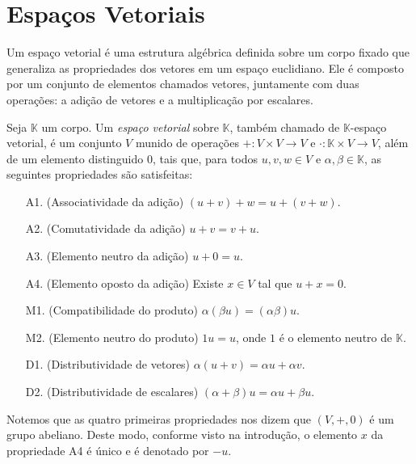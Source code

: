 \section{Espaços Vetoriais}

Um espaço vetorial é uma estrutura algébrica definida sobre um corpo fixado que generaliza as propriedades dos vetores em um espaço euclidiano. Ele é composto por um conjunto de elementos chamados vetores, juntamente com duas operações: a adição de vetores e a multiplicação por escalares.

\begin{definition}
    Seja $\mathbb K$ um corpo.
    Um \emph{espaço vetorial} sobre $\mathbb K$, também chamado de $\mathbb K$-espaço vetorial, é um conjunto $V$ munido de operações $+: V \times V \to V$ e $\cdot: \mathbb K \times V \to V$, além de um elemento distinguido $0$, tais que, para todos $u, v, w \in V$ e $\alpha, \beta \in \mathbb K$, as seguintes propriedades são satisfeitas:
    \begin{itemize}
        \item[A1.] (Associatividade da adição) $(u + v) + w = u + (v + w)$.
        \item[A2.] (Comutatividade da adição) $u + v = v + u$.
        \item[A3.] (Elemento neutro da adição) $u + 0 = u$.
        \item[A4.] (Elemento oposto da adição) Existe $x \in V$ tal que $u + x=0$.
        \item[M1.] (Compatibilidade do produto) $\alpha(\beta u) = (\alpha \beta)u$.
        \item[M2.] (Elemento neutro do produto) $1u = u$, onde $1$ é o elemento neutro de $\mathbb K$.
        \item[D1.] (Distributividade de vetores) $\alpha(u + v) = \alpha u + \alpha v$.
        \item[D2.] (Distributividade de escalares) $(\alpha + \beta)u = \alpha u + \beta u$.
    \end{itemize}
\end{definition}
Notemos que as quatro primeiras propriedades nos dizem que $(V, +, 0)$ é um grupo abeliano.
Deste modo, conforme visto na introdução, o elemento $x$ da propriedade A4 é único e é denotado por $-u$.


